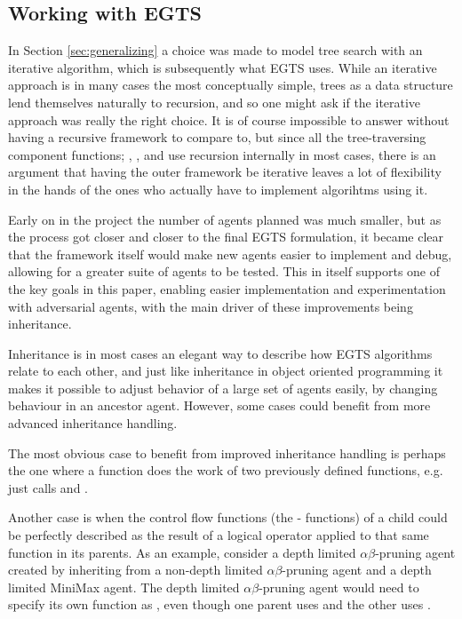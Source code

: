\subsection{Working with EGTS}
In Section \ref{sec:generalizing} a choice was made to model tree search with an iterative algorithm, which is subsequently what EGTS uses. While an iterative approach is in many cases the most conceptually simple, trees as a data structure lend themselves naturally to recursion, and so one might ask if the iterative approach was really the right choice. It is of course impossible to answer without having a recursive framework to compare to, but since all the tree-traversing component functions; \select, \bp, and \trim use recursion internally in most cases, there is an argument that having the outer framework be iterative leaves a lot of flexibility in the hands of the ones who actually have to implement algorihtms using it. 

Early on in the project the number of agents planned was much smaller, but as the process got closer and closer to the final EGTS formulation, it became clear that the framework itself would make new agents easier to implement and debug, allowing for a greater suite of agents to be tested. This in itself supports one of the key goals in this paper, enabling easier implementation and experimentation with adversarial agents, with the main driver of these improvements being inheritance.

Inheritance is in most cases an elegant way to describe how EGTS algorithms relate to each other, and just like inheritance in object oriented programming it makes it possible to adjust behavior of a large set of agents easily, by changing behaviour in an ancestor agent. However, some cases could benefit from more advanced inheritance handling. 

The most obvious case to benefit from improved inheritance handling is perhaps the one where a function does the work of two previously defined functions, e.g.  just calls  and . 

Another case is when the control flow functions (the - functions) of a child could be perfectly described as the result of a logical operator applied to that same function in its parents. As an example, consider a depth limited $\alpha\beta$-pruning agent created by inheriting from a non-depth limited $\alpha\beta$-pruning agent and a depth limited MiniMax agent. The depth limited $\alpha\beta$-pruning agent would need to specify its own \shbp function as , even though one parent uses  and the other uses . 

